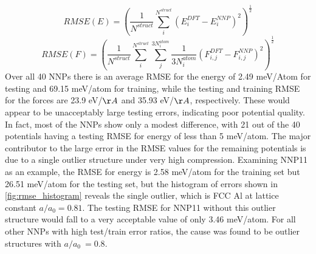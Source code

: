 \documentclass{article}
\begin{document}
\begin{equation}
    RMSE(E) = (\frac{1}{N^{struct}}\sum_i^{N^{struct}} (E^{DFT}_i - E^{NNP}_i)^2)^\frac{1}{2}
\end{equation}
\begin{equation}
        RMSE(F) = (\frac{1}{N^{struct}}\sum_i^{N^{struct}}\sum_j^{3N^{atom}_i}\frac{1}{3N^{atom}_i} (F^{DFT}_{i,j} - F^{NNP}_{i,j})^2)^\frac{1}{2}
\end{equation}
Over all 40 NNPs there is an average RMSE for the energy of 2.49 meV/Atom for testing and 69.15 meV/atom for training, while the testing and training RMSE for the forces are 23.9 eV/$\AA$ and 35.93 eV/$\AA$, respectively.  These would appear to be unacceptably large testing errors, indicating poor potential quality.  In fact, most of the NNPs show only a modest difference, with 21 out of the 40 potentials having a testing RMSE for energy of less than 5 meV/atom.  The major contributor to the large error in the RMSE values for the remaining potentials is due to a single outlier structure under very high compression.  Examining NNP11 as an example, the  RMSE for energy is 2.58 meV/atom for the training set but 26.51 meV/atom for the testing set, but the histogram of errors shown in \ref{fig:rmse_histogram} reveals the single outlier, which is FCC Al at lattice constant $a/a_0 =0.81$.   The testing RMSE for NNP11 without this outlier structure would fall to a very acceptable value of only 3.46 meV/atom.
For all other NNPs with high test/train error ratios, the cause was found to be outlier structures with $a/a_0 ~= 0.8$. 

\end{document}
